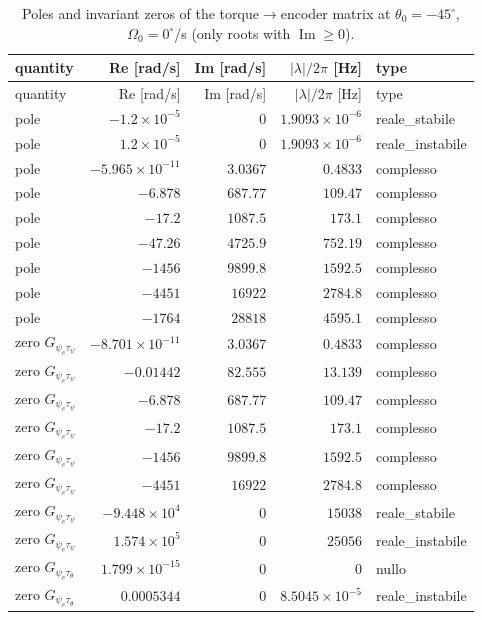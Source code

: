 \documentclass[10pt,a4paper]{article}
\numberwithin{equation}{section}
\begin{document}
\begin{longtable}{lrrrl}
\caption{Poles and invariant zeros of the torque$\to$encoder matrix at $\theta_0 = -45^\circ$, $\Omega_0 = 0^\circ$/s (only roots with $\operatorname{Im} \ge 0$).}\label{tab:polezero}\\
\toprule quantity & Re [rad/s] & Im [rad/s] & $|\lambda|/2\pi$ [Hz] & type \\ \midrule\endfirsthead
\toprule quantity & Re [rad/s] & Im [rad/s] & $|\lambda|/2\pi$ [Hz] & type \\ \midrule\endhead
pole & $-1.2\times10^{-5}$ & $0$ & $1.9093\times10^{-6}$ & reale\_stabile \\
pole & $1.2\times10^{-5}$ & $0$ & $1.9093\times10^{-6}$ & reale\_instabile \\
pole & $-5.965\times10^{-11}$ & $3.0367$ & $0.4833$ & complesso \\
pole & $-6.878$ & $687.77$ & $109.47$ & complesso \\
pole & $-17.2$ & $1087.5$ & $173.1$ & complesso \\
pole & $-47.26$ & $4725.9$ & $752.19$ & complesso \\
pole & $-1456$ & $9899.8$ & $1592.5$ & complesso \\
pole & $-4451$ & $16922$ & $2784.8$ & complesso \\
pole & $-1764$ & $28818$ & $4595.1$ & complesso \\
\midrule
zero $G_{\psi_e\tau_\psi}$ & $-8.701\times10^{-11}$ & $3.0367$ & $0.4833$ & complesso \\
zero $G_{\psi_e\tau_\psi}$ & $-0.01442$ & $82.555$ & $13.139$ & complesso \\
zero $G_{\psi_e\tau_\psi}$ & $-6.878$ & $687.77$ & $109.47$ & complesso \\
zero $G_{\psi_e\tau_\psi}$ & $-17.2$ & $1087.5$ & $173.1$ & complesso \\
zero $G_{\psi_e\tau_\psi}$ & $-1456$ & $9899.8$ & $1592.5$ & complesso \\
zero $G_{\psi_e\tau_\psi}$ & $-4451$ & $16922$ & $2784.8$ & complesso \\
zero $G_{\psi_e\tau_\psi}$ & $-9.448\times10^{4}$ & $0$ & $15038$ & reale\_stabile \\
zero $G_{\psi_e\tau_\psi}$ & $1.574\times10^{5}$ & $0$ & $25056$ & reale\_instabile \\
\midrule
zero $G_{\psi_e\tau_\theta}$ & $1.799\times10^{-15}$ & $0$ & $0$ & nullo \\
zero $G_{\psi_e\tau_\theta}$ & $0.0005344$ & $0$ & $8.5045\times10^{-5}$ & reale\_instabile \\

\end{longtable}
\end{document}

